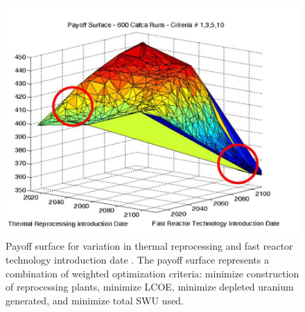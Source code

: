\begin{figure}[]
	\begin{center}
		\includegraphics[scale=0.45]{./figures/passerini_payoff.jpg}
	\end{center}	
		\caption{Payoff surface for variation in thermal 
		reprocessing and fast reactor technology introduction date
        \cite{passerini_systematic_2014}. The payoff surface represents
        a combination of weighted optimization criteria: minimize construction of reprocessing plants, 
        minimize \gls{LCOE}, minimize depleted uranium generated, and minimize total SWU used. 
        }
	\label{fig:passerini_payoff}
\end{figure} 

